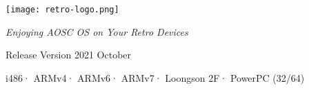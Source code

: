 


    \pagestyle{empty}
    \raggedbottom


    
    \hspace{1pt}
    \vspace{10pt}
    


    {
        \center

        {\Huge{}\fontsize{51pt}{56pt}\selectfont\doctitleA}

        \vspace{10pt}
        \texttt{[image: retro-logo.png]}

        \vspace{15pt}
        {
            \LARGE
            \itshape
            Enjoying AOSC OS on Your Retro Devices
        }
        
        \vspace{10pt}
        \large
        {\sffamily Release Version 2021 October}



        \vspace{20pt}
        \mdseries
        \sffamily

        {i486}\hspace{3pt}·\hspace{3pt}
        {ARMv4}\hspace{3pt}·\hspace{3pt}
        {ARMv6}\hspace{3pt}·\hspace{3pt}
        {ARMv7}\hspace{3pt}·\hspace{3pt}
        {Loongson 2F}\hspace{3pt}·\hspace{3pt}
        {PowerPC (32/64)}

    }

